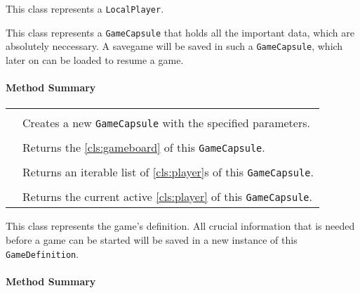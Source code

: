 This class represents a \texttt{LocalPlayer}.

This class represents a \texttt{GameCapsule} that holds all the important data, which are absolutely neccessary. A \gls{savegame} will be saved in such a \texttt{GameCapsule}, which later on can be loaded to resume a game.

\centerdash

\paragraph*{Method Summary}
\paragraph*{}
\begin{longtable}{Lp{10cm}}
	\startmethodtable
	 \\
	& Creates a new \texttt{GameCapsule} with the specified parameters. \\
	 \\
	& Returns the \ref{cls:gameboard} of this \texttt{GameCapsule}. \\
	 \\
	& Returns an iterable list of \ref{cls:player}s of this \texttt{GameCapsule}. \\
	 \\
	& Returns the current active \ref{cls:player} of this \texttt{GameCapsule}. \\
	\hline
\end{longtable}

\pagebreak

This class represents the game's definition. All crucial information that is needed before a game can be started will be saved in a new instance of this \texttt{GameDefinition}.

\centerdash

\paragraph*{Method Summary}

